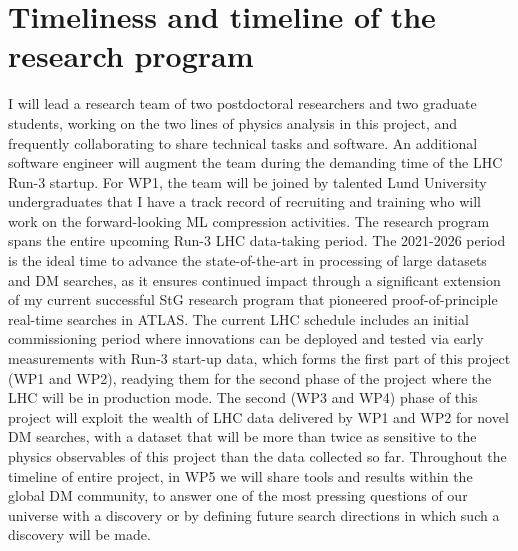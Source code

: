 \documentclass[11pt,a4paper]{article}
\begin{document}
\section{Timeliness and timeline of the research program} 
\smallskip

I will lead a research team of two postdoctoral researchers and two graduate students, working on the two lines of physics analysis in this project, and frequently collaborating to share technical tasks and software. An additional software engineer will augment the team during the demanding time of the LHC Run-3 startup. 
For WP1, the team will be joined by talented Lund University undergraduates that I have a track record of recruiting and training who will work on the forward-looking ML compression activities.
The research program spans the entire upcoming Run-3 LHC data-taking period.
The 2021-2026 period is the ideal time to advance the state-of-the-art in processing of large datasets and DM searches, as it ensures continued impact through a significant extension of my current successful StG research program that pioneered proof-of-principle real-time searches in ATLAS. 
The current LHC schedule includes an initial commissioning period where innovations can be deployed and tested via early measurements with Run-3 start-up data, which forms the first part of this project (WP1 and WP2), readying them for the second phase of the project where the LHC will be in production mode.   
The second (WP3 and WP4) phase of this project will exploit the wealth of LHC data delivered by WP1 and WP2 for novel DM searches, with a dataset that will be more than \color{red}twice \color{black} as sensitive to the physics observables of this project than the data collected so far. 
Throughout the timeline of entire project, in WP5 we will share tools and results within the global DM community, to answer one of the most pressing questions of our universe with a discovery or by defining future search directions in which such a discovery will be made. 

\end{document}

